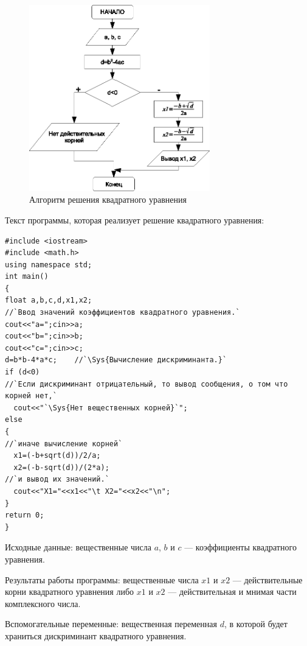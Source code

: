 \begin{figure}[htb]
\begin{center}
\includegraphics[width=0.7\textwidth]{img/ris_3_15}
\caption{Алгоритм решения квадратного уравнения}
\label{ch03:refDrawing14}
\end{center}
\end{figure}

Текст программы, которая реализует решение квадратного уравнения: 
\begin{lstlisting}
#include <iostream>
#include <math.h>
using namespace std;
int main()
{
float a,b,c,d,x1,x2;
//`Ввод значений коэффициентов квадратного уравнения.`
cout<<"a=";cin>>a;
cout<<"b=";cin>>b;
cout<<"c=";cin>>c;
d=b*b-4*a*c;	//`\Sys{Вычисление дискриминанта.}`
if (d<0)        
//`Если дискриминант отрицательный, то вывод сообщения, о том что корней нет,`
  cout<<"`\Sys{Нет вещественных корней}`";
else
{
//`иначе вычисление корней`
  x1=(-b+sqrt(d))/2/a;
  x2=(-b-sqrt(d))/(2*a);
//`и вывод их значений.`
  cout<<"X1="<<x1<<"\t X2="<<x2<<"\n";
}
return 0;
}
\end{lstlisting}


Исходные данные: вещественные числа $a$, $b$ и $c$ --- коэффициенты
квадратного уравнения.

Результаты работы программы: вещественные числа $x1$ и $x2$ --- действительные корни
квадратного уравнения либо $x1$ и $x2$ --- действительная и мнимая части комплексного
числа.

Вспомогательные переменные: вещественная переменная $d$, в которой будет храниться дискриминант
квадратного уравнения.

